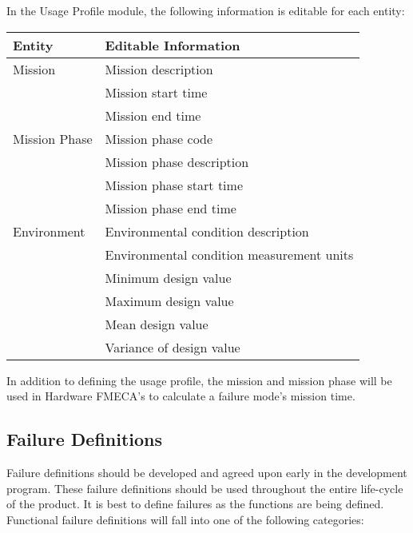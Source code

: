 \documentclass[twoside,12pt,letterpaper,openright]{book}
\begin{document}

\medskip
\noindent In the Usage Profile module, the following information is editable
for each entity:
\\

\begin{tabular}{l | l}
    \hline \hline
    \textbf{Entity} & \textbf{Editable Information} \\
    \hline
    Mission & Mission description \\
            & Mission start time \\
            & Mission end time \\
    \cline{2-2}
    Mission Phase & Mission phase code \\
                  & Mission phase description \\
                  & Mission phase start time \\
                  & Mission phase end time \\
    \cline{2-2}
    Environment & Environmental condition description \\
                & Environmental condition measurement units \\
                & Minimum design value \\
                & Maximum design value \\
                & Mean design value \\
                & Variance of design value \\
    \hline
\end{tabular}

\medskip
\noindent In addition to defining the usage profile, the mission and mission 
phase will be used in Hardware FMECA's to calculate a failure mode's mission 
time.

\subsection{Failure Definitions}

\noindent Failure definitions should be developed and agreed upon early in the 
development program.  These failure definitions should be used throughout the
entire life-cycle of the product.  It is best to define failures as the 
functions are being defined.  Functional failure definitions will fall into one
of the following categories:
\end{document}
